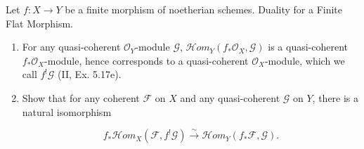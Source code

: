 Let $f: X \to Y$ be a finite morphism of noetherian schemes. Duality for a Finite Flat Morphism.

\begin{enumerate}
\item[(a)] For any quasi-coherent $\mathcal{O}_Y$-module $\mathcal{G}$, $\mathcal{H}om_Y(f_*\mathcal{O}_X, \mathcal{G})$ is a quasi-coherent $f_*\mathcal{O}_X$-module, hence corresponds to a quasi-coherent $\mathcal{O}_X$-module, which we call $f^!\mathcal{G}$ (II, Ex. 5.17e).

\item[(b)] Show that for any coherent $\mathcal{F}$ on $X$ and any quasi-coherent $\mathcal{G}$ on $Y$, there is a natural isomorphism

$$f_*\mathcal{H}om_X(\mathcal{F}, f^!\mathcal{G}) \xrightarrow{\sim} \mathcal{H}om_Y(f_*\mathcal{F}, \mathcal{G}).$$
\end{enumerate}
